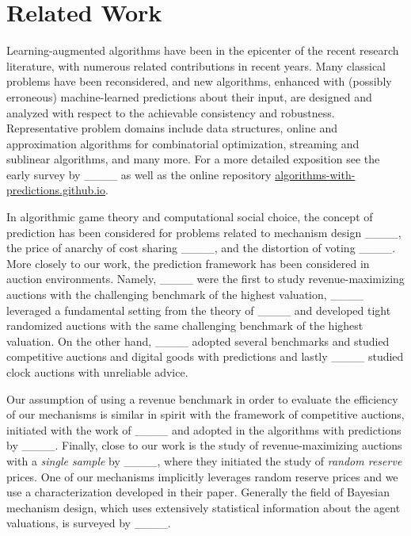 \section{Related Work}
Learning-augmented algorithms have been in the epicenter of the recent research literature, with numerous related contributions in recent years. Many classical problems have been reconsidered, and new algorithms, enhanced with (possibly erroneous) machine-learned predictions about their input, are designed and analyzed with respect to the achievable consistency and robustness. Representative problem domains include data structures, online and approximation algorithms for combinatorial optimization, streaming and sublinear algorithms, and many more. For a more detailed exposition see the early survey by ____ as well as the online repository \url{algorithms-with-predictions.github.io}.

In algorithmic game theory and computational social choice, the concept of prediction has been considered for problems related to mechanism design ____, the price of anarchy of cost sharing ____, and the distortion of voting ____. More closely to our work, the prediction framework has been considered in auction environments. Namely, ____ were the first to study revenue-maximizing auctions with the challenging benchmark of the highest valuation, ____ leveraged a fundamental setting from the theory of ____ and developed tight randomized auctions with the same challenging benchmark of the highest valuation. On the other hand, ____ adopted several benchmarks and studied competitive auctions and digital goods with predictions and lastly ____ studied clock auctions with unreliable advice.

Our assumption of using a revenue benchmark in order to evaluate the efficiency of our mechanisms is similar in spirit with the framework of competitive auctions, initiated with the work of ____ and adopted in the algorithms with predictions by ____. Finally, close to our work is the study of revenue-maximizing auctions with a \textit{single sample} by ____, where they initiated the study of \textit{random reserve} prices. One of our mechanisms implicitly leverages random reserve prices and we use a characterization developed in their paper. Generally the field of Bayesian mechanism design, which uses extensively statistical information about the agent valuations, is surveyed by ____.